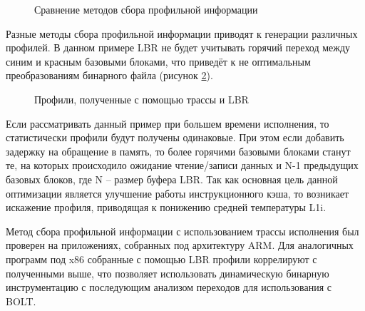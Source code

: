  
\begin{figure}[ht]
    \centerfloat{
        \texttt{[image: vs1]}
    }
    \caption{Сравнение методов сбора профильной информации}\label{fig:LBRvsTRace}
\end{figure}

Разные методы сбора профильной информации приводят к генерации различных профилей. В данном примере LBR не будет учитывать горячий переход между синим и красным базовыми блоками, что приведёт к не оптимальным преобразованиям бинарного файла (рисунок \cref{fig:LBRvsTraceRes}).
 
\begin{figure}[ht]
    \centerfloat{
        \texttt{[image: vs2]}
    }
    \caption{Профили, полученные с помощью трассы и LBR}\label{fig:LBRvsTraceRes}
\end{figure}

	Если рассматривать данный пример при большем времени исполнения, то статистически профили будут получены одинаковые. При этом если добавить задержку на обращение в память, то более горячими базовыми блоками станут те, на которых происходило ожидание чтение/записи данных и N-1 предыдущих базовых блоков, где N – размер буфера LBR. Так как основная цель данной оптимизации является улучшение работы инструкционного кэша, то возникает искажение профиля, приводящая к понижению средней температуры L1i.

Метод сбора профильной информации с использованием трассы исполнения был проверен на приложениях, собранных под архитектуру ARM. Для аналогичных программ под x86 собранные с помощью LBR профили коррелируют с полученными выше, что позволяет использовать динамическую бинарную инструментацию с последующим анализом переходов для использования с BOLT.

